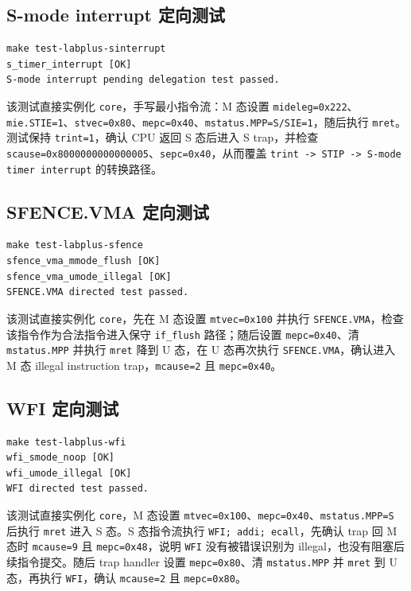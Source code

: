 \documentclass[UTF8,a4paper,11pt]{ctexart}
\begin{document}
\subsection{S-mode interrupt 定向测试}

\begin{Verbatim}[fontsize=\small]
make test-labplus-sinterrupt
s_timer_interrupt [OK]
S-mode interrupt pending delegation test passed.
\end{Verbatim}

该测试直接实例化 \texttt{core}，手写最小指令流：M 态设置 \texttt{mideleg=0x222}、\texttt{mie.STIE=1}、\texttt{stvec=0x80}、\texttt{mepc=0x40}、\texttt{mstatus.MPP=S/SIE=1}，随后执行 \texttt{mret}。测试保持 \texttt{trint=1}，确认 CPU 返回 S 态后进入 S trap，并检查 \texttt{scause=0x8000000000000005}、\texttt{sepc=0x40}，从而覆盖 \texttt{trint -> STIP -> S-mode timer interrupt} 的转换路径。

\subsection{SFENCE.VMA 定向测试}

\begin{Verbatim}[fontsize=\small]
make test-labplus-sfence
sfence_vma_mmode_flush [OK]
sfence_vma_umode_illegal [OK]
SFENCE.VMA directed test passed.
\end{Verbatim}

该测试直接实例化 \texttt{core}，先在 M 态设置 \texttt{mtvec=0x100} 并执行 \texttt{SFENCE.VMA}，检查该指令作为合法指令进入保守 \texttt{if\_flush} 路径；随后设置 \texttt{mepc=0x40}、清 \texttt{mstatus.MPP} 并执行 \texttt{mret} 降到 U 态，在 U 态再次执行 \texttt{SFENCE.VMA}，确认进入 M 态 illegal instruction trap，\texttt{mcause=2} 且 \texttt{mepc=0x40}。

\subsection{WFI 定向测试}

\begin{Verbatim}[fontsize=\small]
make test-labplus-wfi
wfi_smode_noop [OK]
wfi_umode_illegal [OK]
WFI directed test passed.
\end{Verbatim}

该测试直接实例化 \texttt{core}，M 态设置 \texttt{mtvec=0x100}、\texttt{mepc=0x40}、\texttt{mstatus.MPP=S} 后执行 \texttt{mret} 进入 S 态。S 态指令流执行 \texttt{WFI; addi; ecall}，先确认 trap 回 M 态时 \texttt{mcause=9} 且 \texttt{mepc=0x48}，说明 \texttt{WFI} 没有被错误识别为 illegal，也没有阻塞后续指令提交。随后 trap handler 设置 \texttt{mepc=0x80}、清 \texttt{mstatus.MPP} 并 \texttt{mret} 到 U 态，再执行 \texttt{WFI}，确认 \texttt{mcause=2} 且 \texttt{mepc=0x80}。
\end{document}
